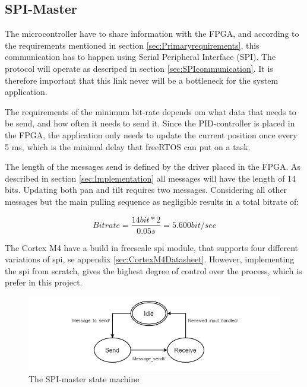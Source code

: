 \subsection{SPI-Master}
\label{sec:SPIMaster}

The microcontroller have to share information with the FPGA, and according to the requirements mentioned in section \ref{sec:Primaryrequirements}, this communication has to happen using Serial Peripheral Interface (SPI). The protocol will operate as descriped in section \ref{sec:SPIcommunication}. It is therefore important that this link never will be a bottleneck for the system application. 

The requirements of the minimum bit-rate depends om what data that needs to be send, and how often it needs to send it. Since the PID-controller is placed in the FPGA, the application only needs to update the current position once every 5 ms, which is the minimal delay that freeRTOS can put on a task. 

The length of the messages send is defined by the driver placed in the FPGA. As described in section \ref{sec:Implementation} all messages will have the length of 14 bits. Updating both pan and tilt requires two messages. Considering all other messages but the main pulling sequence as negligible results in a total bitrate of:

\begin{equation}
Bitrate = \frac{
14 bit * 2	
}{
0.05s
} = 5.600 bit/sec 
\end{equation}

The Cortex M4 have a build in freescale spi module, that supports four different variations of spi, se appendix \ref{sec:CortexM4Datasheet}. However, implementing the spi from scratch, gives the highest degree of control over the process, which is prefer in this project. 

\begin{figure}
	\centering
	\includegraphics[scale = 0.7] {Billeder/SPI-master}
	\caption{The SPI-master state machine}
	\label{fig:SPI-master}
\end{figure}

